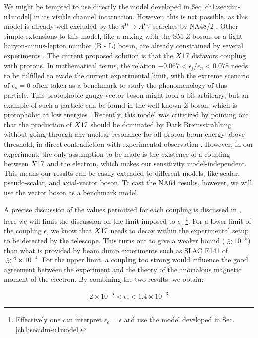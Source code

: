 We might be tempted to use directly the model developed in Sec.\ref{ch1:sec:dm-u1model} in its visible channel incarnation. However, this is not possible, as this model is already well excluded by the $\pi^0 \to A' \gamma$ searches by NA48/2 \cite{na48}. Other simple extensions to this model, like a mixing with the SM $Z$ boson, or a light baryon-minus-lepton number (B - L) boson, are already constrained by several experiments \cite{PhysRevD.95.035017}. The current proposed solution is that the $X17$ disfavors coupling with protons. In mathematical terms, the relation $-0.067 < \epsilon_p/\epsilon_n < 0.078$ needs to be fulfilled to evade the current experimental limit, with the extreme scenario of $\epsilon_p = 0$ often taken as a benchmark to study the phenomenology of this particle. This protophobic gauge vector boson might look a bit arbitrary, but an example of such a particle can be found in the well-known $Z$ boson, which is protophobic at low energies \cite{PhysRevD.95.035017}. Recently, this model was criticized by pointing out that the production of $X17$ should be dominated by Dark Bremsstrahlung without going through any nuclear resonance for all proton beam energy above threshold, in direct contradiction with experimental observation \cite{zhang2020protophobic}.  However, in our experiment, the only assumption to be made is the existence of a coupling between $X17$ and the electron, which makes our sensitivity model-independent. This means our results can be easily extended to different models, like scalar, pseudo-scalar, and axial-vector boson. To cast the NA64 results, however, we will use the vector boson as a benchmark model.

A precise discussion of the values permitted for each coupling is discussed in \cite{Feng:2016jff,PhysRevD.95.035017}, here we will limit the discussion on the limit imposed to $\epsilon_e$ \footnote{Effectively one can interpret $\epsilon_e = \epsilon$ and use the model developed in Sec.\ref{ch1:sec:dm-u1model}}. For a lower limit of the coupling $\epsilon$, we know that $X17$ needs to decay within the experimental setup to be detected by the telescope. This turns out to give a weaker bound ($\gtrsim 10^{-5}$) than what is provided by beam dump experiments such as SLAC E141 \cite{blum} of $\gtrsim 2 \times 10^{-4}$. For the upper limit, a coupling too strong would influence the good agreement between the experiment and the theory of the anomalous magnetic moment of the electron. By combining the two results, we obtain:

\begin{equation}
  \label{eq:x17-limits}
  2 \times 10^{-5} < \epsilon_e < 1.4 \times 10^{-3}
\end{equation}

